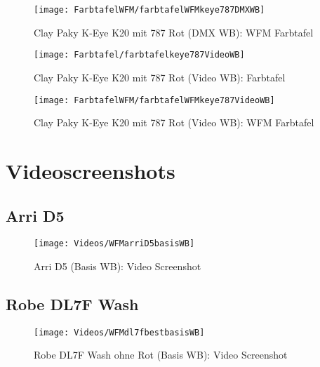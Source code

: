 \documentclass[pagesize,paper=A4,fontsize=12pt,utf8,numbers=noenddot,bibliography=totoc,listof=totoc,DIV=11,BCOR=1mm]{scrreprt}
\begin{document}
\begin{figure}[htp]     %
\centering
\texttt{[image: FarbtafelWFM/farbtafelWFMkeye787DMXWB]} 
\caption {Clay Paky K-Eye K20 mit 787 Rot (DMX WB): WFM Farbtafel} 
\end{figure}

\begin{figure}[htp]     %
\centering
\texttt{[image: Farbtafel/farbtafelkeye787VideoWB]} 
\caption {Clay Paky K-Eye K20 mit 787 Rot (Video WB): Farbtafel} 
\end{figure}

\begin{figure}[htp]     %
\centering
\texttt{[image: FarbtafelWFM/farbtafelWFMkeye787VideoWB]} 
\caption {Clay Paky K-Eye K20 mit 787 Rot (Video WB): WFM Farbtafel} 
\end{figure}



\section{Videoscreenshots}

\subsection{Arri D5}

\begin{figure}[htp]     %
\centering
\texttt{[image: Videos/WFMarriD5basisWB]} 
\caption {Arri D5 (Basis WB): Video Screenshot} 
\end{figure}

\subsection{Robe DL7F Wash}

\begin{figure}[htp]     %
\centering
\texttt{[image: Videos/WFMdl7fbestbasisWB]} 
\caption {Robe DL7F Wash ohne Rot (Basis WB): Video Screenshot} 
\end{figure}
\end{document}
